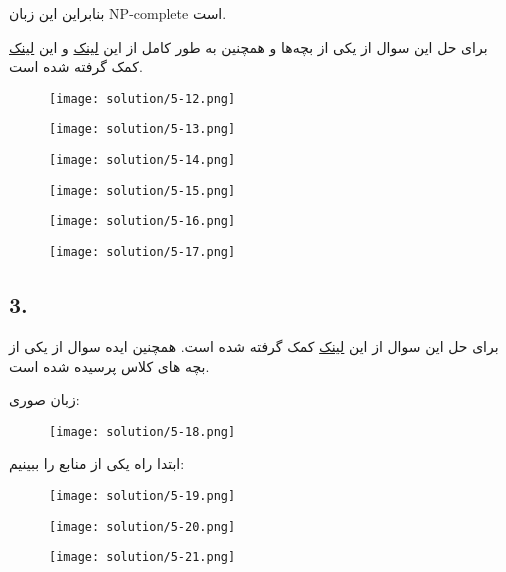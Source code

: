 بنابراین این زبان NP-complete است.

برای حل این سوال از یکی از بچه‌ها و همچنین به طور کامل از این 
\href{https://www.seas.upenn.edu/~cis5110/notes/cis511-sl15.pdf}{لینک}
و این 
\href{https://web.stanford.edu/class/archive/cs/cs103/cs103.1132/lectures/27/Small27.pdf}{لینک}
کمک گرفته شده است.

\begin{figure}[H]
    \centering
    \texttt{[image: solution/5-12.png]}
\end{figure}
\begin{figure}[H]
    \centering
    \texttt{[image: solution/5-13.png]}
\end{figure}
\begin{figure}[H]
    \centering
    \texttt{[image: solution/5-14.png]}
\end{figure}
\begin{figure}[H]
    \centering
    \texttt{[image: solution/5-15.png]}
\end{figure}
\begin{figure}[H]
    \centering
    \texttt{[image: solution/5-16.png]}
\end{figure}
\begin{figure}[H]
    \centering
    \texttt{[image: solution/5-17.png]}
\end{figure}

\subsection*{3. }
برای حل این سوال از این 
\href{https://www.cs.cornell.edu/courses/cs4820/2018fa/lectures/subset_sum.pdf}{لینک} کمک گرفته شده است.
همچنین ایده سوال از یکی از بچه های کلاس پرسیده شده است.

زبان صوری:
\begin{figure}[H]
    \centering
    \texttt{[image: solution/5-18.png]}
\end{figure}

ابتدا راه یکی از منابع را ببینیم:
\begin{figure}[H]
    \centering
    \texttt{[image: solution/5-19.png]}
\end{figure}
\begin{figure}[H]
    \centering
    \texttt{[image: solution/5-20.png]}
\end{figure}
\begin{figure}[H]
    \centering
    \texttt{[image: solution/5-21.png]}
\end{figure}

